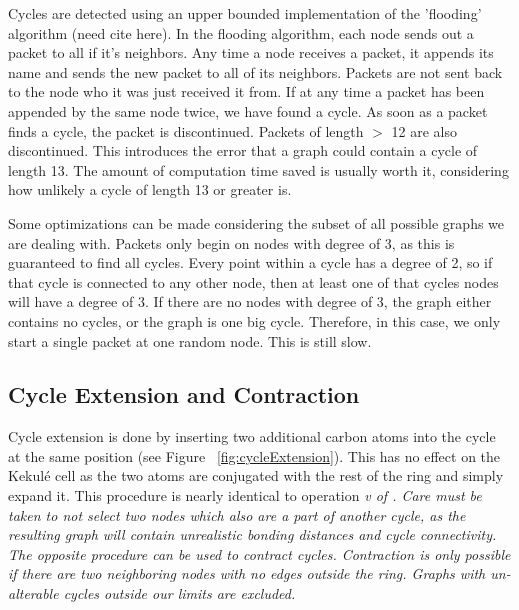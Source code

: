 \documentclass[12pt]{article}
\begin{document}
Cycles are detected using an upper bounded implementation of the 'flooding' algorithm (need cite here). In the flooding algorithm, each node sends out a packet to all if it's neighbors. Any time a node receives a packet, it appends its name and sends the new packet to all of its neighbors. Packets are not sent back to the node who it was just received it from. If at any time a packet has been appended by the same node twice, we have found a cycle. As soon as a packet finds a cycle, the packet is discontinued. Packets of length $>$ 12 are also discontinued. This introduces the error that a graph could contain a cycle of length 13. The amount of computation time saved is usually worth it, considering how unlikely a cycle of length 13 or greater is. 

Some optimizations can be made considering the subset of all possible graphs we are dealing with. Packets only begin on nodes with degree of 3, as this is guaranteed to find all cycles. Every point within a cycle has a degree of 2, so if that cycle is connected to any other node, then at least one of that cycles nodes will have a degree of 3. If there are no nodes with degree of 3, the graph either contains no cycles, or the graph is one big cycle. Therefore, in this case, we only start a single packet at one random node. This is still slow.

\subsection{Cycle Extension and Contraction}
Cycle extension is done by inserting two additional carbon atoms into the cycle at the same position (see Figure ~\ref{fig:cycleExtension}). This has no effect on the Kekul\'e cell as the two atoms are conjugated with the rest of the ring and simply expand it. This procedure is nearly identical to operation \it{v} of \cite{v06}. Care must be taken to not select two nodes which also are a part of another cycle, as the resulting graph will contain unrealistic bonding distances and cycle connectivity. The opposite procedure can be used to contract cycles. Contraction is only possible if there are two neighboring nodes with no edges outside the ring. Graphs with un-alterable cycles outside our limits are excluded.
\end{document}

